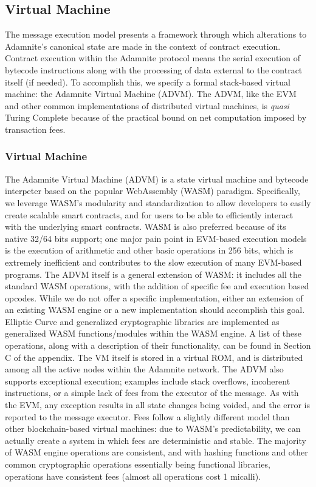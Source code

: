 \documentclass[conference]{IEEEtran}
\begin{document}
\subsection{Virtual Machine}
The message execution model presents a framework through which alterations to Adamnite's canonical state are made in the context of contract execution. Contract execution within the Adamnite protocol means the serial execution of bytecode instructions along with the processing of data external to the contract itself (if needed). To accomplish this, we specify a formal stack-based virtual machine: the Adamnite Virtual Machine (ADVM). The ADVM, like the EVM and other common implementations of distributed virtual machines, is \emph{quasi} Turing Complete because of the practical bound on net computation imposed by transaction fees. 
\subsubsection{Virtual Machine}
The Adamnite Virtual Machine (ADVM) is a state virtual machine and bytecode interpeter based on the popular WebAssembly (WASM) paradigm. Specifically, we leverage WASM's modularity and standardization to allow developers to easily create scalable smart contracts, and for users to be able to efficiently interact with the underlying smart contracts. WASM is also preferred because of its native 32/64 bits support; one major pain point in EVM-based execution models is the execution of arithmetic and other basic operations in 256 bits, which is extremely inefficient and contributes to the slow execution of many EVM-based programs. The ADVM itself is a general extension of WASM: it includes all the standard WASM operations, with the addition of specific fee and execution based opcodes. While we do not offer a specific implementation, either an extension of an existing WASM engine or a new implementation should accomplish this goal. Elliptic Curve and generalized cryptographic libraries are implemented as generalized WASM functions/modules within the WASM engine. A list of these operations, along with a description of their functionality, can be found in Section C of the appendix. The VM itself is stored in a virtual ROM, and is distributed among all the active nodes within the Adamnite network. The ADVM also supports exceptional execution; examples include stack overflows, incoherent instructions, or a simple lack of fees from the executor of the message. As with the EVM, any exception results in all state changes being voided, and the error is reported to the message executor. Fees follow a slightly different model than other blockchain-based virtual machines: due to WASM's predictability, we can actually create a system in which fees are deterministic and stable. The majority of WASM engine operations are consistent, and with hashing functions and other common cryptographic operations essentially being functional libraries, operations have consistent fees (almost all operations cost 1 micalli).
\end{document}
